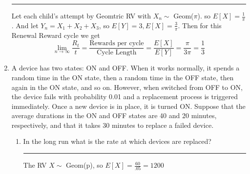 \documentclass{article} %
\theoremstyle{plain}
\theoremstyle{case}
\begin{document}
\begin{enumerate}[label={\fbox{\textbf{Exercise \#\arabic* :}}}]
\par\noindent\rule{\textwidth}{0.1pt}
      Let each child's attempt by Geomtric RV with $X_n \sim $ Geom($\pi$).
    so $E[X] = \frac{1}{\pi}$.
    And let $Y_n = X_1 + X_2 + X_3$, so $E[Y] = 3, E[X] = \frac{3}{\pi}$. 
    Then for this Renewal Reward cycle we get
    \[ \lim_{n \to \infty} \frac{R_t}{t} =
        \frac{\text{Rewards per cycle}}{\text{Cycle Length}}
        = \frac{E[X]}{E[Y]}
        = \frac{\pi}{3 \pi} = \frac{1}{3}   \]
  \newpage
  \item A device has two states: ON and OFF. When it works normally, it
    spends a random time in the ON state, then a random time in the OFF
    state, then again in the ON state, and so on. However, when switched
    from OFF to ON, the device fails with probability 0.01 and a
    replacement process is triggered immediately. Once a new device is in
    place, it is turned ON. Suppose that the average durations in the ON
    and OFF states are 40 and 20 minutes, respectively, and that it takes
    30 minutes to replace a failed device.
    \begin{enumerate}
      \item In the long run what is the rate at which devices are replaced?
\par\noindent\rule{\textwidth}{0.1pt}
        The RV $X \sim$ Geom(p), so $E[X] = \frac{60}{.05} = 1200 $


\end{enumerate}
\end{enumerate}
\end{document}
